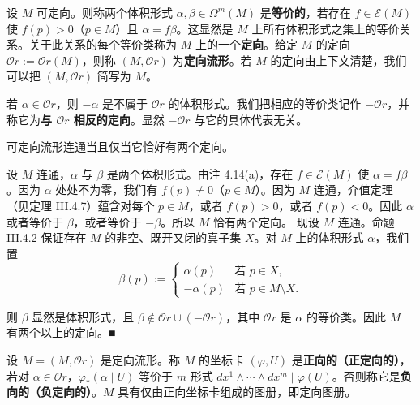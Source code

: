 设 $ M $ 可定向。则称两个体积形式 $ \alpha, \beta \in \Omega^{m}(M) $ 是\textbf{等价的}，若存在 $ f \in \mathcal{E}(M) $ 使 $ f(p) > 0 $（$ p \in M $）且 $ \alpha = f\beta $。这显然是 $ M $ 上所有体积形式之集上的等价关系。关于此关系的每个等价类称为 $ M $ 上的一个\textbf{定向}。给定 $ M $ 的定向 $ \mathcal{O}r := \mathcal{O}r(M) $，则称 $ (M, \mathcal{O}r) $ 为\textbf{定向流形}。若 $ M $ 的定向由上下文清楚，我们可以把 $ (M, \mathcal{O}r) $ 简写为 $ M $。

若 $ \alpha \in \mathcal{O}r $，则 $ -\alpha $ 是不属于 $ \mathcal{O}r $ 的体积形式。我们把相应的等价类记作 $ -\mathcal{O}r $，并称它为\textbf{与 $ \mathcal{O}r $ 相反的定向}。显然 $ -\mathcal{O}r $ 与它的具体代表无关。

\begin{remark}

\begin{items}
\item

可定向流形连通当且仅当它恰好有两个定向。

\proofhead
设 $ M $ 连通，$ \alpha $ 与 $ \beta $ 是两个体积形式。由注 4.14(a)，存在 $ f \in \mathcal{E}(M) $ 使 $ \alpha = f\beta $。因为 $ \alpha $ 处处不为零，我们有 $ f(p) \neq 0 $（$ p \in M $）。因为 $ M $ 连通，介值定理（见定理 III.4.7）蕴含对每个 $ p \in M $，或者 $ f(p) > 0 $，或者 $ f(p) < 0 $。因此 $ \alpha $ 或者等价于 $ \beta $，或者等价于 $ -\beta $。所以 $ M $ 恰有两个定向。
现设 $ M $ 连通。命题 III.4.2 保证存在 $ M $ 的非空、既开又闭的真子集 $ X $。对 $ M $ 上的体积形式 $ \alpha $，我们置
\begin{equation*}
\beta(p) := \begin{cases} \alpha(p) & \text{若 } p \in X , \\ -\alpha(p) & \text{若 } p \in M \setminus X . \end{cases}
\end{equation*}

则 $ \beta $ 显然是体积形式，且 $ \beta \notin \mathcal{O}r \cup (-\mathcal{O}r) $，其中 $ \mathcal{O}r $ 是 $ \alpha $ 的等价类。因此 $ M $ 有两个以上的定向。\nobreak\hspace{0.35em}■

\item

设 $ M = (M, \mathcal{O}r) $ 是定向流形。称 $ M $ 的坐标卡 $ (\varphi, U) $ 是\textbf{正向的（正定向的）}，若对 $ \alpha \in \mathcal{O}r $，$ \varphi_{\ast}(\alpha \mid U) $ 等价于 $ m $ 形式 $ dx^{1} \wedge \cdots \wedge dx^{m} \mid \varphi(U) $。否则称它是\textbf{负向的（负定向的）}。$ M $ 具有仅由正向坐标卡组成的图册，即定向图册。


\end{items}
\end{remark}
